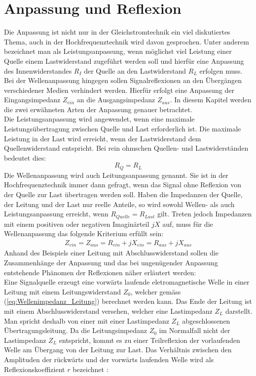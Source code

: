 \section{Anpassung und Reflexion}\label{sec:AnpassungReflexionen}
Die Anpassung ist nicht nur in der Gleichstromtechnik ein viel diskutiertes Thema, auch in der Hochfrequenztechnik wird davon gesprochen. Unter anderem bezeichnet man als Leistungsanpassung, wenn möglichst viel Leistung einer Quelle einem Lastwiderstand zugeführt werden soll und hierfür eine Anpassung des Innenwiderstandes $R_I$ der Quelle an den Lastwiderstand $R_L$ erfolgen muss. Bei der  Wellenanpassung hingegen sollen Signalreflexionen an den Übergängen verschiedener Medien verhindert werden. Hierfür erfolgt eine Anpassung der Eingangsimpedanz $Z_{ein}$ an die Ausgangsimpedanz $Z_{aus}$. 
In diesem Kapitel werden die zwei erwähneten Arten der Anpassung genauer betrachtet.\\
Die Leistungsanpassung wird angewendet, wenn eine maximale Leistungsübertragung zwischen Quelle und Last erforderlich ist. Die maximale Leistung in der Last wird erreicht, wenn der Lastwiderstand dem Quellenwiderstand entspricht. Bei rein ohmschen Quellen- und Lastwiderständen bedeutet dies:\\
\[R_{Q} = R_{L}\]
Die Wellenanpassung wird auch Leitungsanpassung genannt. Sie ist in der Hochfrequenztechnik immer dann gefragt, wenn das Signal ohne Reflexion von der Quelle zur Last übertragen werden soll. Haben die Impedanzen der Quelle, der Leitung und der Last nur reelle Anteile, so wird sowohl Wellen- als auch Leistungsanpassung erreicht, wenn $R_{Quelle} = R_{Last}$ gilt. Treten jedoch Impedanzen mit einem positiven oder negativen Imaginärteil $jX$ auf, muss für die Wellenanpassung das folgende Kriterium erfüllt sein:
\begin{eqnarray}\label{eq:ZeinZaus}
Z_{ein} = Z_{aus} = R_{ein} +jX_{ein} = R_{aus} + jX_{aus}
\end{eqnarray}
Anhand des Beispiels einer Leitung mit Abschlusswiderstand sollen die Zusammenhänge der Anpassung und das bei ungenügender Anpassung  entstehende Phänomen der Reflexionen näher erläutert werden: \\
Eine Signalquelle erzeugt eine vorwärts laufende eletromagnetische Welle in einer Leitung mit einem Leitungswiderstand $Z_0$, welcher gemäss (\ref{eq:Wellenimpedanz_Leitung}) berechnet werden kann. Das Ende der Leitung ist mit einem Abschlusswiderstand versehen, welcher eine Lastimpedanz $Z_L$ darstellt. Man spricht deshalb von einer mit einer Lastimpedanz $Z_L$ abgeschlossenen Übertragungsleitung. Da die Leitungsimpedanz $Z_0$ im Normalfall nicht der Lastimpedanz $Z_L$ entspricht, kommt es zu einer   Teilreflexion der vorlaufenden Welle am Übergang von der Leitung zur Last. Das Verhältnis zwischen den Amplituden der rückwärts und der vorwärts laufenden Welle wird als Reflexionskoeffizient $r$ bezeichnet \cite{Tekom}: \\
